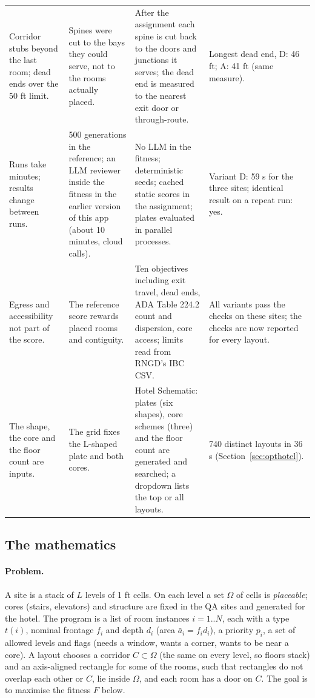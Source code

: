 {\begin{longtable}{p{3.13cm}p{3.52cm}p{4.66cm}p{3.42cm}}
Corridor stubs beyond the last room; dead ends over the 50 ft limit. & Spines were cut to the bays they could serve, not to the rooms actually placed. & After the assignment each spine is cut back to the doors and junctions it serves; the dead end is measured to the nearest exit door or through-route. & Longest dead end, D: 46 ft; A: 41 ft (same measure). \\
Runs take minutes; results change between runs. & 500 generations in the reference; an LLM reviewer inside the fitness in the earlier version of this app (about 10 minutes, cloud calls). & No LLM in the fitness; deterministic seeds; cached static scores in the assignment; plates evaluated in parallel processes. & Variant D: 59 s for the three sites; identical result on a repeat run: yes. \\
Egress and accessibility not part of the score. & The reference score rewards placed rooms and contiguity. & Ten objectives including exit travel, dead ends, ADA Table 224.2 count and dispersion, core access; limits read from RNGD's IBC CSV. & All variants pass the checks on these sites; the checks are now reported for every layout. \\
The shape, the core and the floor count are inputs. & The grid fixes the L-shaped plate and both cores. & Hotel Schematic: plates (six shapes), core schemes (three) and the floor count are generated and searched; a dropdown lists the top or all layouts. & 740 distinct layouts in 36 s (Section~\ref{sec:opthotel}). \\
\bottomrule
\end{longtable}}\addtocounter{table}{-1}


\subsection{The mathematics}
\label{sec:optmath}
\paragraph{Problem.} A site is a stack of $L$ levels of 1 ft cells. On each level a set $\Omega$ of cells is
\emph{placeable}; cores (stairs, elevators) and structure are fixed in the QA sites and generated for the hotel. The program
is a list of room instances $i = 1..N$, each with a type $t(i)$, nominal frontage $f_i$ and depth $d_i$ (area
$\bar a_i = f_i d_i$), a priority $p_i$, a set of allowed levels and flags (needs a window, wants a corner, wants to be near a
core). A layout chooses a corridor $C \subset \Omega$ (the same on every level, so floors stack) and an axis-aligned rectangle
for some of the rooms, such that rectangles do not overlap each other or $C$, lie inside $\Omega$, and each room has a door on
$C$. The goal is to maximise the fitness $F$ below.

